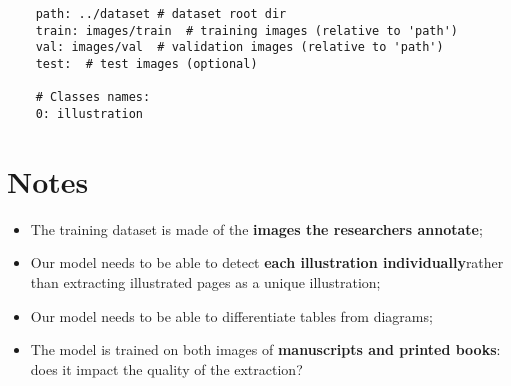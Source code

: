 \begin{verbatim}
	path: ../dataset # dataset root dir
	train: images/train  # training images (relative to 'path')
	val: images/val  # validation images (relative to 'path')
	test:  # test images (optional)
	
	# Classes names:
	0: illustration
\end{verbatim}

\section{Notes}
	\begin{itemize}
		\item The training dataset is made of the \textbf{images the researchers annotate};
		\item Our model needs to be able to detect \textbf{each illustration individually}rather than extracting illustrated pages as a unique illustration;
		\item Our model needs to be able to differentiate tables from diagrams;
		\item The model is trained on both images of \textbf{manuscripts and printed books}: does it impact the quality of the extraction?
	\end{itemize}
